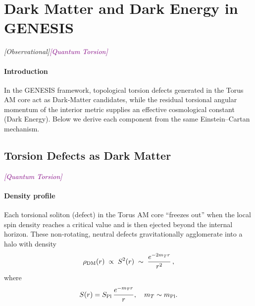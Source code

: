 \documentclass{article}
\newcommand{\Splanck}{\ensuremath{S_{\mathrm{Pl}}}}
\newcommand{\TorsionProfile}{S^2(r)}
\newcommand{\quantumtag}{\textcolor{purple}{\textit{[Quantum Torsion]}}}
\newcommand{\obstag}{\textcolor{green!60!black}{\textit{[Observational]}}}
\begin{document}
\medskip
\begin{center}
\end{center}
\medskip


\section{Dark Matter and Dark Energy in GENESIS}
\label{sec:DM-DE}
\obstag   \quantumtag

\paragraph{Introduction}
In the GENESIS framework, topological torsion defects generated in the Torus AM core act as Dark‐Matter candidates, while the residual torsional angular momentum of the interior metric supplies an effective cosmological constant (Dark Energy).  Below we derive each component from the same Einstein–Cartan mechanism.

\subsection{Torsion Defects as Dark Matter}
\label{sec:DM}
\quantumtag

\paragraph{Density profile}
Each torsional soliton (defect) in the Torus AM core “freezes out” when the local spin density reaches a critical value and is then ejected beyond the internal horizon.  These non‐rotating, neutral defects gravitationally agglomerate into a halo with density
\begin{equation}\label{eq:rhoDM}
  \rho_{\rm DM}(r)\;\propto\;\TorsionProfile
  \;\sim\;\frac{e^{-2 m_T r}}{r^2}\,,
\end{equation}
where
\begin{equation}
  S(r)=\Splanck\,\frac{e^{-m_T r}}{r}, 
  \quad
  m_T\sim m_{\rm Pl}.
\end{equation}
\end{document}

